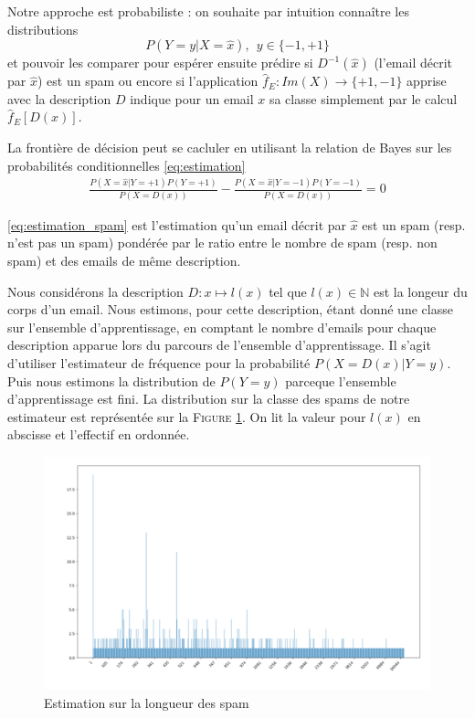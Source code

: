 \documentclass[a4paper, french]{article}
\begin{document}
Notre approche est probabiliste : on souhaite par intuition conna\^itre les distributions 
\label{eq:estimation}
\begin{equation}P(Y=y|X=\hat{x}),\ \ y\in\{-1,+1\}\end{equation}
et pouvoir les comparer pour esp\'erer ensuite pr\'edire si $D^{-1}(\hat{x})$ (l'email d\'ecrit par $\hat{x}$) est un spam ou encore si l'application $\hat{f}_E\colon Im(X)\rightarrow \{+1,-1\}$ apprise avec la description $D$ indique pour un email $x$ sa classe simplement par le calcul $\hat{f}_E[ D(x)]$.

La fronti\`ere de d\'ecision peut se cacluler en utilisant la relation de Bayes sur les probabilit\'es conditionnelles \eqref{eq:estimation}
\begin{align}
\label{eq:estimation_spam}
\frac{P(X=\hat{x}|Y=+1)P(Y=+1)}{P(X=D(x))}
- \frac{P(X=\hat{x}|Y=-1)P(Y=-1)}{P(X=D(x))}=0
\end{align}

\eqref{eq:estimation_spam} est l'estimation qu'un email d\'ecrit par $\hat{x}$ est un spam (resp. n'est pas un spam) pond\'er\'ee par le ratio entre le nombre de spam (resp. non spam) et des emails de m\^eme description.

Nous consid\'erons la description $D\colon x\mapsto l(x)$ 
tel que $l(x)\in \mathbb{N}$ est la longeur du corps d'un email. 
Nous estimons, pour cette description, \'etant donn\'e une classe 
sur l'ensemble d'apprentissage, en comptant le nombre d'emails 
pour chaque description apparue lors du parcours de l'ensemble d'apprentissage. 
Il s'agit d'utiliser l'estimateur de fr\'equence pour la probabilit\'e 
$P(X=D(x)|Y=y)$. Puis nous estimons la distribution de $P(Y=y)$ parceque 
l'ensemble d'apprentissage est fini. 
La distribution sur la classe des spams de notre estimateur est 
repr\'esent\'ee sur la F\textsc{igure} \ref{fig:histo1spam}.
On lit la valeur pour $l(x)$ en abscisse et l'effectif en ordonn\'ee.

\begin{figure}[h]
\begin{center}
    \caption{Estimation sur la longueur des spam}
    \label{fig:histo1spam}
    \includegraphics[width=13cm]{histo}
\end{center}
\end{figure}
\end{document}
